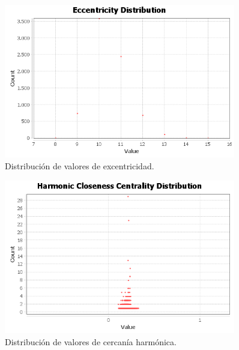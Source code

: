 \begin{figure}[H]
    \centerfloat
    \includegraphics[width=0.9\textwidth]{img/resultados/distanciaGrafo/Eccentricity Distribution.png}
    \caption{Distribución de valores de excentricidad.}
\end{figure}

\begin{figure}[H]
    \centerfloat
    \includegraphics[width=0.9\textwidth]{img/resultados/distanciaGrafo/Harmonic Closeness Centrality Distribution.png}
    \caption{Distribución de valores de cercanía harmónica.}
\end{figure}

